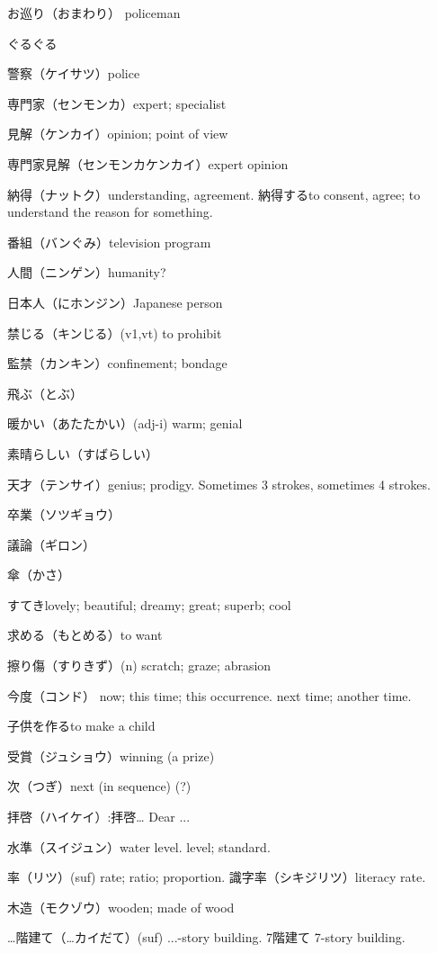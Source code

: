 お巡り（おまわり）
policeman

ぐるぐる

警察（ケイサツ）police

専門家（センモンカ）expert; specialist

見解（ケンカイ）opinion; point of view

専門家見解（センモンカケンカイ）expert opinion

納得（ナットク）understanding, agreement.
納得するto consent, agree; to understand the reason for something.

番組（バンぐみ）television program

人間（ニンゲン）humanity?

日本人（にホンジン）Japanese person

禁じる（キンじる）(v1,vt) to prohibit

監禁（カンキン）confinement; bondage


飛ぶ（とぶ）

暖かい（あたたかい）(adj-i) warm; genial

素晴らしい（すばらしい）

天才（テンサイ）genius; prodigy.
Sometimes 3 strokes, sometimes 4 strokes.

卒業（ソツギョウ）

議論（ギロン）

傘（かさ）

すてきlovely; beautiful; dreamy; great; superb; cool

求める（もとめる）to want

擦り傷（すりきず）(n) scratch; graze; abrasion

今度（コンド）
now; this time; this occurrence.
next time; another time.

子供を作るto make a child

受賞（ジュショウ）winning (a prize)

次（つぎ）next (in sequence) (?)

拝啓（ハイケイ）:拝啓… Dear ...

水準（スイジュン）water level. level; standard.

率（リツ）(suf) rate; ratio; proportion.
識字率（シキジリツ）literacy rate.

木造（モクゾウ）wooden; made of wood

…階建て（…カイだて）(suf) ...-story building.
7階建て 7-story building.

